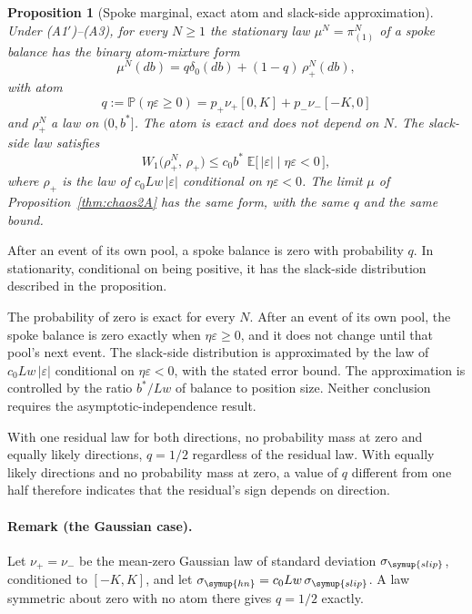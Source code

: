 \documentclass[11pt,a4paper]{article}
\theoremstyle{siphon}
\newtheorem{proposition}{Proposition}
\begin{document}
\begin{proposition}[Spoke marginal, exact atom and slack-side approximation]\label{thm:chaos2B}
Under (A1$'$)--(A3), for every $N \geq 1$ the stationary law $\mu^N = \pi^N_{(1)}$ of a spoke balance has the binary atom-mixture form
\begin{equation}\label{eq:chaoslimit}
\mu^N(db)  =  q \delta_0(db)  +  (1 - q)\,\rho^N_+(db),
\end{equation}
with atom
\[
q  :=  \mathbb{P}(\eta \varepsilon \geq 0)  =  p_+ \nu_+[0, K] + p_- \nu_-[-K, 0]
\]
and $\rho^N_+$ a law on $(0, b^*]$. The atom is exact and does not depend on $N$. The slack-side law satisfies
\[
W_1\bigl(\rho^N_+,\,\rho_+\bigr)  \leq  c_0 b^*\;\mathbb{E}\bigl[\,|\varepsilon| \mid \eta \varepsilon < 0\,\bigr],
\]
where $\rho_+$ is the law of $c_0 Lw\,|\varepsilon|$ conditional on $\eta \varepsilon < 0$. The limit $\mu$ of Proposition~\ref{thm:chaos2A} has the same form, with the same $q$ and the same bound.
\end{proposition}

\noindent After an event of its own pool, a spoke balance is zero with probability $q$. In stationarity, conditional on being positive, it has the slack-side distribution described in the proposition.

The probability of zero is exact for every $N$. After an event of its own pool, the spoke balance is zero exactly when $\eta \varepsilon \geq 0$, and it does not change until that pool's next event. The slack-side distribution is approximated by the law of $c_0 Lw\,|\varepsilon|$ conditional on $\eta \varepsilon < 0$, with the stated error bound. The approximation is controlled by the ratio $b^*/Lw$ of balance to position size. Neither conclusion requires the asymptotic-independence result.

With one residual law for both directions, no probability mass at zero and equally likely directions, $q = 1/2$ regardless of the residual law. With equally likely directions and no probability mass at zero, a value of $q$ different from one half therefore indicates that the residual's sign depends on direction.

\paragraph{Remark (the Gaussian case).}
Let $\nu_+ = \nu_-$ be the mean-zero Gaussian law of standard deviation $\sigma_{\symup{slip}}$, conditioned to $[-K, K]$, and let $\sigma_{\symup{hn}} = c_0 Lw\,\sigma_{\symup{slip}}$. A law symmetric about zero with no atom there gives $q = 1/2$ exactly.
\end{document}
